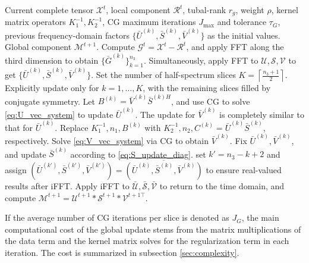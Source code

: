 \documentclass[a4paper,12pt]{article}
\numberwithin{equation}{section}
\numberwithin{algorithm}{section}
\theoremstyle{remark}
\theoremstyle{definition}
\begin{document}
\begin{algorithm}[!htbp]
	\caption{Updating Global Factors}
	\label{alg:update_global}
	\begin{algorithmic}[1]
		\REQUIRE		
		Current complete tensor $\mathcal{X}^{t}$, local component $\mathcal{R}^{t}$, tubal-rank $r_g$, weight $\rho$, kernel matrix operators $K_1^{-1},K_2^{-1}$,
		CG maximum iterations $J_{\max}$ and tolerance $\tau_G$, previous frequency-domain factors $\{\bar U^{(k)},\bar S^{(k)},\bar V^{(k)}\}$ as the initial values.
		\ENSURE Global component $\mathcal{M}^{t+1}$.		
		\STATE Compute $\mathcal{G}^{t}=\mathcal{X}^{t}-\mathcal{R}^{t}$, and apply FFT along the third dimension to obtain $\{\bar G^{(k)}\}_{k=1}^{n_3}$. Simultaneously, apply FFT to $\mathcal{U},\mathcal{S},\mathcal{V}$ to get $\{\bar U^{(k)},\bar S^{(k)},\bar V^{(k)}\}$.
		\STATE Set the number of half-spectrum slices $K=\left\lceil\frac{n_3+1}{2}\right\rceil$. Explicitly update only for $k=1,\ldots,K$, with the remaining slices filled by conjugate symmetry.
		\STATE Let $B^{(k)}=\bar V^{(k)}\bar S^{(k)H}$, and use CG to solve \eqref{eq:U_vec_system} to update $\bar U^{(k)}$.
		\STATE The update for $\bar V^{(k)}$ is completely similar to that for $\bar U^{(k)}$. 
		Replace $K_1^{-1}, n_1, B^{(k)}$ with $K_2^{-1}, n_2, C^{(k)} = \bar U^{(k)} \bar S^{(k)}$, respectively. Solve \eqref{eq:V_vec_system} via CG to obtain $\bar V^{(k)}$.
		\STATE Fix $\bar U^{(k)},\bar V^{(k)}$, and update $\bar S^{(k)}$ according to \eqref{eq:S_update_diag}.
		\STATE set $k'=n_3-k+2$ and assign $(\bar U^{(k')},\bar S^{(k')},\bar V^{(k')})=\overline{(\bar U^{(k)},\bar S^{(k)},\bar V^{(k)})}$ to ensure real-valued results after iFFT.
		\ENDIF
		\ENDFOR
		\STATE Apply iFFT to $\bar{\mathcal{U}},\bar{\mathcal{S}},\bar{\mathcal{V}}$ to return to the time domain, and compute $\mathcal{M}^{t+1}=\mathcal{U}^{t+1}*\mathcal{S}^{t+1}*\mathcal{V}^{t+1\top}$.
	\end{algorithmic}
\end{algorithm}



If the average number of CG iterations per slice is denoted as $J_G$, the main computational cost of the global update stems from the matrix multiplications of the data term and the kernel matrix solves for the regularization term in each iteration. The cost is summarized in subsection \ref{sec:complexity}.
\end{document}

